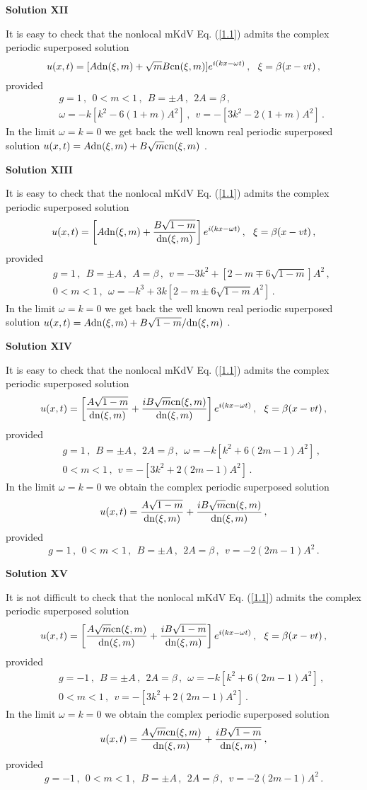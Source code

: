 \documentclass[11pt]{article}
\newcommand{\be}{\begin{equation}}
\newcommand{\ee}{\end{equation}}
\newcommand{\bea}{\begin{eqnarray}}
\newcommand{\eea}{\end{eqnarray}}
\newcommand{\dn}{{\rm dn}}
\newcommand{\cn}{{\rm cn}}
\begin{document}
{\bf Solution XII}

It is easy to check that the nonlocal mKdV Eq. (\ref{1.1}) admits the
complex periodic superposed solution
\be\label{7.19}
u(x,t) = [A \dn(\xi,m)+\sqrt{m} B \cn(\xi,m)] e^{i(kx-\omega t)}\,,
~~\xi = \beta(x-vt)\,,
\ee
provided
\bea\label{7.20}
&&g = 1\,,~~0 < m < 1\,,~~B = \pm A\,,~~2A = \beta\,, \nonumber \\
&&\omega = -k[k^2-6(1+m)A^2]\,,~~v = -[3k^2-2(1+m)A^2]\,.
\eea
In the limit $\omega = k = 0$ we get back the well known real periodic 
superposed solution $u(x,t)=A\dn(\xi,m)+B\sqrt{m}\cn(\xi,m)$ \cite{ks1,ks3}. 

{\bf Solution XIII}

It is easy to check that the nonlocal mKdV Eq. (\ref{1.1}) admits the
complex periodic superposed solution
\be\label{7.21}
u(x,t) = \left[A \dn(\xi,m)+\frac{B \sqrt{1-m}}{\dn(\xi,m)}\right] e^{i(kx-\omega t)}\,,
~~\xi = \beta(x-vt)\,,
\ee
provided
\bea\label{7.22}
&&g = 1\,,~~B = \pm A\,,~~A = \beta\,,
~~v = -3k^2 +[2-m \mp 6\sqrt{1-m}]A^2\,, \nonumber \\
&&0 < m < 1\,,~~\omega = -k^3 +3k [2-m \pm 6\sqrt{1-m} A^2]\,.
\eea
In the limit $\omega = k = 0$ we get back the well known real periodic 
superposed solution $u(x,t)=A\dn(\xi,m)+ {B\sqrt{1-m}}/{\dn(\xi,m)}$ 
\cite{ks1,ks3}. 

{\bf Solution XIV}

It is easy to check that the nonlocal mKdV Eq. (\ref{1.1}) admits the
complex periodic superposed solution
\be\label{7.23}
u(x,t) = \left[\frac{A\sqrt{1-m}}{\dn(\xi,m)}+\frac{iB \sqrt{m}\cn(\xi,m)}
{\dn(\xi,m)}\right] e^{i(kx-\omega t)}\,,~~\xi = \beta(x-vt)\,,
\ee
provided
\bea\label{7.24}
&&g = 1\,,~~B = \pm A\,,~~2A = \beta\,,~~\omega 
= -k[k^2+6 (2m-1)A^2]\,, \nonumber \\
&&0 < m < 1\,,~~v = -[3k^2 +2(2m-1)A^2]\,.
\eea
In the limit $\omega = k = 0$ we obtain the complex periodic 
superposed solution 
\be\label{7.25}
u(x,t)=\frac{A\sqrt{1-m}}{\dn(\xi,m)}+\frac{iB\sqrt{m}\cn(\xi,m)}{\dn(\xi,m)}\,,
\ee
provided
\be\label{7.26}
g = 1\,,~~0 < m < 1\,,~~B = \pm A\,,~~2A = \beta\,,
~~v = -2(2m-1)A^2\,.
\ee

{\bf Solution XV}

It is not difficult to check that the nonlocal mKdV Eq. (\ref{1.1}) admits the
complex periodic superposed solution
\be\label{7.27}
u(x,t) = \left[\frac{A\sqrt{m}\cn(\xi,m)}{\dn(\xi,m)}+\frac{iB \sqrt{1-m}}
{\dn(\xi,m)}\right] e^{i(kx-\omega t)}\,,~~\xi = \beta(x-vt)\,,
\ee
provided
\bea\label{7.28}
&&g = -1\,,~~B = \pm A\,,~~2A = \beta\,,~~\omega 
= -k[k^2+6 (2m-1)A^2]\,, \nonumber \\
&&0 < m < 1\,,~~v = -[3k^2 +2(2m-1)A^2]\,.
\eea
In the limit $\omega = k = 0$ we obtain the complex periodic 
superposed solution 
\be\label{7.29}
u(x,t) = \frac{A\sqrt{m}\cn(\xi,m)}{\dn(\xi,m)}+\frac{iB \sqrt{1-m}}
{\dn(\xi,m)}\,,
\ee
provided
\be\label{7.30}
g = -1\,,~~0 < m < 1\,,~~B = \pm A\,,~~2A = \beta\,,
~~v = -2(2m-1)A^2\,.
\ee
\end{document}
